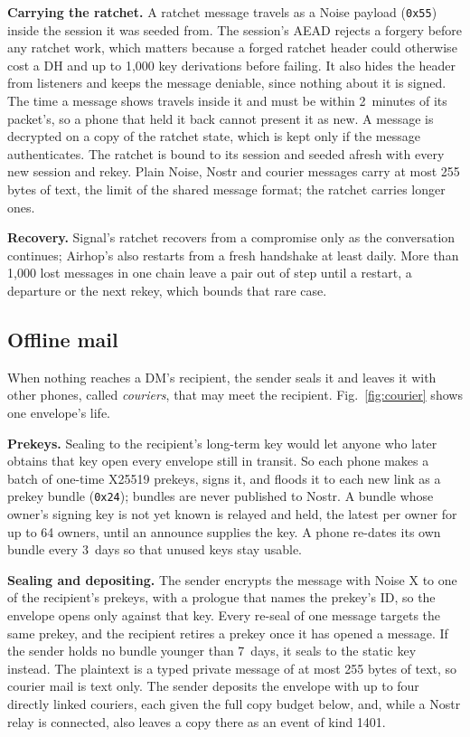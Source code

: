 \documentclass[conference]{IEEEtran}
\newcommand{\hx}[1]{\texttt{0x#1}}
\begin{document}
\textbf{Carrying the ratchet.} A ratchet message travels as a Noise payload (\hx{55}) inside the session it was seeded from. The session's AEAD rejects a forgery before any ratchet work, which matters because a forged ratchet header could otherwise cost a DH and up to 1,000 key derivations before failing. It also hides the header from listeners and keeps the message deniable, since nothing about it is signed. The time a message shows travels inside it and must be within 2~minutes of its packet's, so a phone that held it back cannot present it as new. A message is decrypted on a copy of the ratchet state, which is kept only if the message authenticates. The ratchet is bound to its session and seeded afresh with every new session and rekey. Plain Noise, Nostr and courier messages carry at most 255 bytes of text, the limit of the shared message format; the ratchet carries longer ones.

\textbf{Recovery.} Signal's ratchet recovers from a compromise only as the conversation continues; Airhop's also restarts from a fresh handshake at least daily. More than 1,000 lost messages in one chain leave a pair out of step until a restart, a departure or the next rekey, which bounds that rare case.

\subsection{Offline mail}
\label{sec:courier}

When nothing reaches a DM's recipient, the sender seals it and leaves it with other phones, called \emph{couriers}, that may meet the recipient. Fig.~\ref{fig:courier} shows one envelope's life.

\textbf{Prekeys.} Sealing to the recipient's long-term key would let anyone who later obtains that key open every envelope still in transit. So each phone makes a batch of one-time X25519 prekeys, signs it, and floods it to each new link as a prekey bundle (\hx{24}); bundles are never published to Nostr. A bundle whose owner's signing key is not yet known is relayed and held, the latest per owner for up to 64 owners, until an announce supplies the key. A phone re-dates its own bundle every 3~days so that unused keys stay usable.

\textbf{Sealing and depositing.} The sender encrypts the message with Noise X to one of the recipient's prekeys, with a prologue that names the prekey's ID, so the envelope opens only against that key. Every re-seal of one message targets the same prekey, and the recipient retires a prekey once it has opened a message. If the sender holds no bundle younger than 7~days, it seals to the static key instead. The plaintext is a typed private message of at most 255 bytes of text, so courier mail is text only. The sender deposits the envelope with up to four directly linked couriers, each given the full copy budget below, and, while a Nostr relay is connected, also leaves a copy there as an event of kind 1401.
\end{document}
